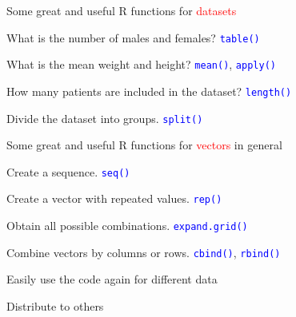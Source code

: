 \documentclass{presentatiesmetlogo}
\newcommand{\code}[1]{\textcolor{blue}{\texttt{#1}}}
\newcommand{\R}{{\textsf{R} }}
\begin{document}
\eitemt
\eitem
\bitem
\item Some great and useful \R functions for \textcolor{red}{datasets}
\newline
\newline
\bitemt
\item What is the number of males and females? \code{table()}
\item What is the mean weight and height? \code{mean()}, \code{apply()}
\item How many patients are included in the dataset? \code{length()}
\item Divide the dataset into groups. \code{split()}
\eitemt
\eitem
\bitem
\item Some great and useful \R functions for \textcolor{red}{vectors} in general
\newline
\newline
\bitemt
\item Create a sequence. \code{seq()}
\item Create a vector with repeated values. \code{rep()}
\item Obtain all possible combinations. \code{expand.grid()}
\item Combine vectors by columns or rows. \code{cbind()}, \code{rbind()}
\eitemt
\eitem
\fbox{\textcolor{red}{You can also create your own functions!}}
\newline
\newline
\bitemt
\item Easily use the code again for different data
\item Distribute to others
\eitemt
\end{document}
